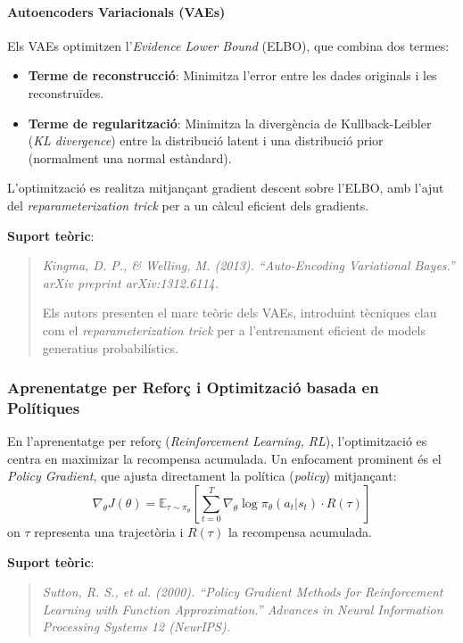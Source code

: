 {\paragraph{Autoencoders Variacionals (VAEs)}
Els VAEs optimitzen l'\textit{Evidence Lower Bound} (ELBO), que combina dos termes:

\begin{itemize}
\item \textbf{Terme de reconstrucció}: Minimitza l'error entre les dades originals i les reconstruïdes.

\item \textbf{Terme de regularització}: Minimitza la divergència de Kullback-Leibler (\textit{KL divergence}) entre la distribució latent i una distribució prior (normalment una normal estàndard).
\end{itemize}

L'optimització es realitza mitjançant gradient descent sobre l'ELBO, amb l'ajut del \textit{reparameterization trick} per a un càlcul eficient dels gradients.

\textbf{Suport teòric}:
\begin{quote}
\textit{Kingma, D. P., \& Welling, M. (2013). ``Auto-Encoding Variational Bayes.'' arXiv preprint arXiv:1312.6114.}

Els autors presenten el marc teòric dels VAEs, introduint tècniques clau com el \textit{reparameterization trick} per a l'entrenament eficient de models generatius probabilístics.
\end{quote}

\subsubsection{Aprenentatge per Reforç i Optimització basada en Polítiques}
En l'aprenentatge per reforç (\textit{Reinforcement Learning, RL}), l'optimització es centra en maximizar la recompensa acumulada. Un enfocament prominent és el \textit{Policy Gradient}, que ajusta directament la política (\textit{policy}) mitjançant:
\[ \nabla_\theta J(\theta) = \mathbb{E}_{\tau \sim \pi_\theta} \left[ \sum_{t=0}^T \nabla_\theta \log \pi_\theta(a_t|s_t) \cdot R(\tau) \right] \]
on $\tau$ representa una trajectòria i $R(\tau)$ la recompensa acumulada.

\textbf{Suport teòric}:
\begin{quote}
\textit{Sutton, R. S., et al. (2000). ``Policy Gradient Methods for Reinforcement Learning with Function Approximation.'' Advances in Neural Information Processing Systems 12 (NeurIPS).}


\end{quote}}
